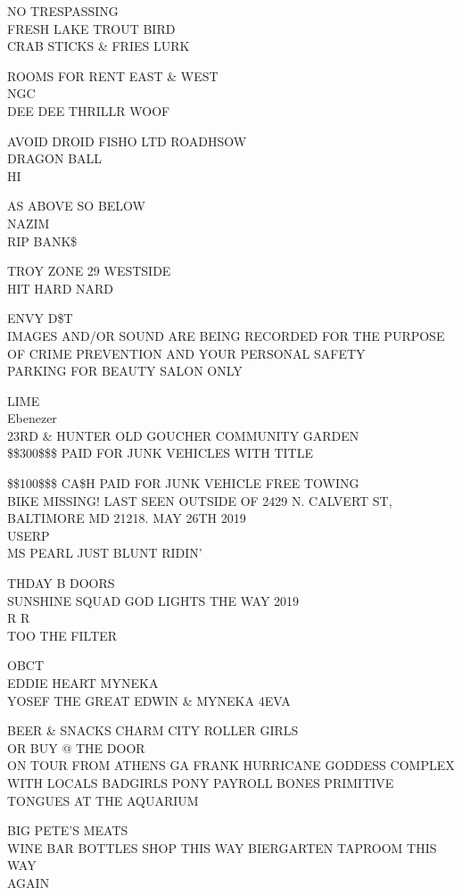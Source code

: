 \documentclass[10pt,letterpaper]{article}
\begin{document}
NO TRESPASSING\\
FRESH LAKE TROUT BIRD\\
CRAB STICKS \& FRIES LURK

ROOMS FOR RENT EAST \& WEST\\
NGC\\
DEE DEE THRILLR WOOF

AVOID DROID FISHO LTD ROADHSOW\\
DRAGON BALL\\
HI

AS ABOVE SO BELOW\\
NAZIM\\
RIP BANK\$

TROY ZONE 29 WESTSIDE\\
HIT HARD NARD

ENVY D\$T\\
IMAGES AND/OR SOUND ARE BEING RECORDED FOR THE PURPOSE OF CRIME PREVENTION AND YOUR PERSONAL SAFETY\\
PARKING FOR BEAUTY SALON ONLY

LIME\\
Ebenezer\\
23RD \& HUNTER OLD GOUCHER COMMUNITY GARDEN\\
\$\$300\$\$\$ PAID FOR JUNK VEHICLES WITH TITLE

\$\$100\$\$\$ CA\$H PAID FOR JUNK VEHICLE FREE TOWING\\
BIKE MISSING!  LAST SEEN OUTSIDE OF 2429 N. CALVERT ST, BALTIMORE MD 21218.  MAY 26TH 2019\\
USERP\\
MS PEARL JUST BLUNT RIDIN'

THDAY B DOORS\\
SUNSHINE SQUAD GOD LIGHTS THE WAY 2019\\
R R\\
TOO THE FILTER

OBCT\\
EDDIE HEART MYNEKA\\
YOSEF THE GREAT EDWIN \& MYNEKA 4EVA

BEER \& SNACKS CHARM CITY ROLLER GIRLS\\
OR BUY @ THE DOOR\\
ON TOUR FROM ATHENS GA FRANK HURRICANE GODDESS COMPLEX WITH LOCALS BADGIRLS PONY PAYROLL BONES PRIMITIVE TONGUES AT THE AQUARIUM

BIG PETE'S MEATS\\
WINE BAR BOTTLES SHOP THIS WAY BIERGARTEN TAPROOM THIS WAY\\
AGAIN
\end{document}
